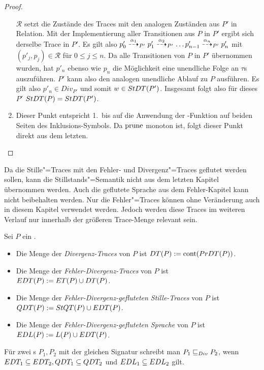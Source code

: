 \begin{proof}
\begin{enumerate}
      $\mathcal{R}$ setzt die Zustände des Traces mit den analogen Zuständen
      aus $P'$ in Relation. Mit der Implementierung aller Transitionen aus $P$
      in $P'$ ergibt sich derselbe Trace in $P'$. Es gilt also $p'_0
      \may[\alpha _1]_{P'} p'_1 \may[\alpha _2]_{P'} \dots p'_{n-1} \may[\alpha
      _n]_{P'} p'_n$ mit $(p'_j,p_j) \in \mathcal{R}$ für $0\leq j \leq n$. Da
      alle Transitionen von $P$ in $P'$ übernommen wurden, hat $p'_n$ ebenso
      wie $p_n$ die Möglichkeit eine unendliche Folge an $\tau$s auszuführen.
      $P'$ kann also den analogen unendliche Ablauf zu $P$ ausführen. Es gilt
      also $p'_n\in Div _{P'}$ und somit $w\in StDT (P')$. Insgesamt folgt
      also für dieses $P'$ $StDT (P) = StDT (P')$.
    \item Dieser Punkt entspricht 1.\ bis auf die Anwendung der
      \prune{}-Funktion auf beiden Seiten des Inklusions-Symbols. Da $\mathrm{prune}{}$
      monoton ist, folgt dieser Punkt direkt aus dem letzten.
  \end{enumerate}
\end{proof}

Da die Stille"=Traces mit den Fehler- und Divergenz"=Traces geflutet werden
sollen, kann die Stillstands"=Semantik nicht aus dem letzten Kapitel übernommen
werden. Auch die geflutete Sprache aus dem Fehler-Kapitel kann nicht
beibehalten werden. Nur die Fehler"=Traces \ET{} können ohne Veränderung auch
in diesem Kapitel verwendet werden. Jedoch werden diese Traces im weiteren
Verlauf nur innerhalb der größeren Trace-Menge \EDT{} relevant sein.

\begin{Def}
  \label{DivSemDef}
  Sei $P$ ein \MEIO{}.
  \begin{itemize}
    \item Die Menge der \emph{Divergenz-Traces} von $P$ ist $DT (P) := \mathrm{cont}
      (PrDT (P))$.
    \item Die Menge der \emph{Fehler-Divergenz-Traces} von $P$ ist $EDT (P) :=
      ET (P)\cup DT (P)$.
    \item Die Menge der \emph{Fehler-Divergenz-gefluteten
      Stille-Traces} von $P$ ist $QDT (P) := StQT (P)\cup EDT (P)$.
    \item Die Menge der \emph{Fehler-Divergenz-gefluteten
      Sprache} von $P$ ist $EDL (P) := L(P)\cup EDT (P)$.
  \end{itemize}
  Für zwei \MEIO{}s $P_1,P_2$ mit der gleichen Signatur schreibt man $P_1 \sqsubseteq  _{Div}
  P_2$, wenn $EDT _1\subseteq EDT _2, QDT _1\subseteq QDT _2$ und $EDL
  _1\subseteq EDL _2$ gilt.
\end{Def}


